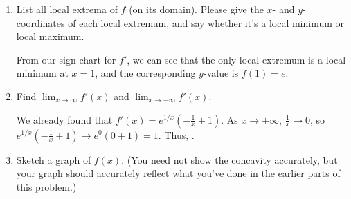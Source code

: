 \documentclass{article}
\begin{document}
\begin{enumerate}
\begin{enumerate}
    \pspace{\newpage}

  \item
    \begin{problem}[\vfill]
      List all local extrema of $f$ (on its domain).  Please give the $x$-
      and $y$-coordinates of each local extremum, and say whether it's a
      local minimum or local maximum. 
    \end{problem}

    \begin{solution}
      From our sign chart for $f'$, we can see that the only local
      extremum is a local minimum at $x = 1$, and the corresponding
      $y$-value is $f(1) = e$. 
    \end{solution}

  \item
    \begin{problem}[\vfill]
      Find $\displaystyle \lim_{x \to \infty} f'(x)$ and $\displaystyle
      \lim_{x \to - \infty} f'(x)$.
    \end{problem}

    \begin{solution}
      We already found that $f'(x) = e^{1/x} \left( - \frac{1}{x} + 1
      \right)$.  As $x \to \pm \infty$, $\frac{1}{x} \to 0$, so
      $\displaystyle e^{1/x} \left( - \frac{1}{x} + 1 \right) \to e^0
      \left( 0 + 1 \right) = 1$.  Thus, .
    \end{solution}

  \item
    \begin{problem}[\stretch{2}]
      Sketch a graph of $f(x)$.  (You need not show the
      concavity accurately, but your graph should accurately reflect what
      you've done in the earlier parts of this problem.)
    \end{problem}


\end{enumerate}
\end{enumerate}
\end{document}
